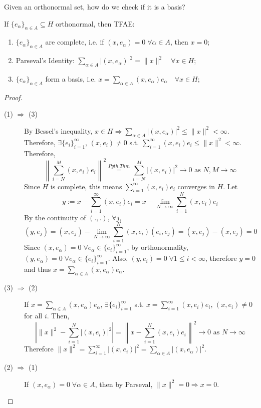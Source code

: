 \begin{goal}[question]
    Given an orthonormal set, how do we check if it is a basis?
\end{goal}

\begin{thm}
    If $\{e_\alpha\}_{\alpha \in A} \subseteq H$ orthonormal, then TFAE:
    \begin{enumerate}
        \item $\{e_\alpha\}_{\alpha \in A}$ are complete, i.e. if $(x, e_\alpha) = 0 \; \forall 
        \alpha \in A$, then $x = 0$;
        \item Parseval's Identity: $\sum_{\alpha \in A} |(x, e_\alpha)|^2 = \| x \|^2 \quad \forall x \in H$; 
        \item $\{e_\alpha\}_{\alpha \in A}$ form a basis, i.e. $x = \sum_{\alpha \in A} 
        (x, e_\alpha)e_\alpha \quad \forall x \in H$;
    \end{enumerate} 
\end{thm}
\begin{proof} \leavevmode
    \begin{description}
        \item[(1) $\Rightarrow$ (3)] By Bessel's inequality, 
        $x \in H \Rightarrow \sum_{\alpha \in A} |(x, e_\alpha)|^2 \leq \| x \|^2 < \infty$. 
        Therefore, $\exists \{e_i\}_{i = 1}^\infty$, $(x, e_i) \neq 0$ s.t. 
        $\sum_{i = 1}^\infty (x, e_i)e_i \leq \| x \|^2 < \infty $.
        Therefore,
        \[
            \left\| \sum_{i =N}^M (x, e_i) e_i \right\|^2 \overset{Pyth. Thm}{=}
             \sum_{i = N}^M |(x, e_i)|^2 \to 0 \text{ as } N, M \to \infty
        \] 
        Since $H$ is complete, this means $\sum_{i=1}^{\infty} (x, e_i) e_i$ converges in $H$.
        Let \[
        y := x - \sum_{i =1}^\infty (x, e_i) e_i = x - \lim_{N \to \infty} \sum_{i = 1}^N 
        (x, e_i) e_i
        \]
        By the continuity of $(. , .)$, $\forall j$,
        \[
            (y, e_j) = (x, e_j) - \lim_{N \to \infty} \sum_{i = 1}^N (x, e_i)(e_i, e_j)
            = (x, e_j) - (x, e_j) = 0 
        \]   
        Since $(x, e_\alpha) = 0 \; \forall e_\alpha \in \{e_i\}_{i=1}^\infty$, by orthonormality,
        $(y, e_\alpha) = 0 \; \forall e_\alpha \in \{e_i \}_{i = 1}^\infty$. Also,
        $(y, e_i) = 0 \; \forall 1 \leq i < \infty $, therefore $y = 0 $ and thus
        $x = \sum_{\alpha \in A} (x, e_\alpha)e_\alpha$.
        \item[(3) $\Rightarrow$ (2)] If $x = \sum_{\alpha \in A} (x, e_\alpha) e_\alpha$,
        $\exists \{e_i\}_{i = 1}^{\infty}$ s.t. $x = \sum_{i = 1}^\infty (x, e_i)e_i$, $(x, e_i) 
        \neq 0$ for all $i$. Then,
        \[
            \left| \| x \|^2 - \sum_{i = 1}^N |(x, e_i)|^2  \right| = 
            \left\| x - \sum_{i = 1}^N (x, e_i) e_i \right\|^2 \to 0 \text{ as } N \to \infty 
        \]    
        Therefore $\| x \|^2 = \sum_{i = 1}^\infty |(x, e_i)|^2 = 
        \sum_{\alpha \in A} |(x, e_\alpha)|^2$.
        \item[(2) $\Rightarrow$  (1)] If $(x, e_\alpha) = 0 \; \forall \alpha \in A$, then
        by Parseval, $\| x \|^2 = 0 \Rightarrow x = 0$. \qedhere  
    \end{description}
\end{proof}

